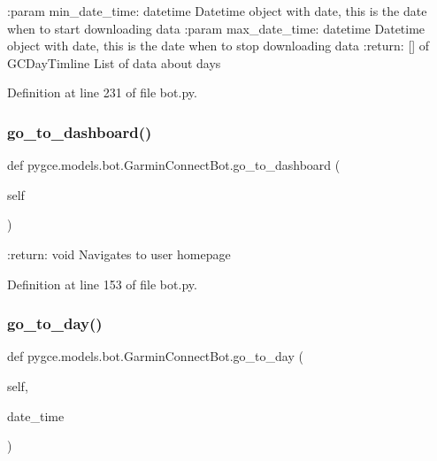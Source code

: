 \begin{DoxyVerb}:param min_date_time: datetime
    Datetime object with date, this is the date when to start downloading data
:param max_date_time: datetime
    Datetime object with date, this is the date when to stop downloading data
:return: [] of GCDayTimline
    List of data about days
\end{DoxyVerb}
 

Definition at line 231 of file bot.\+py.

\mbox{\label{classpygce_1_1models_1_1bot_1_1_garmin_connect_bot_ad9433580f9aced25b650ddd5e912cc52}} 
\subsubsection{\texorpdfstring{go\+\_\+to\+\_\+dashboard()}{go\_to\_dashboard()}}
{\footnotesize\ttfamily def pygce.\+models.\+bot.\+Garmin\+Connect\+Bot.\+go\+\_\+to\+\_\+dashboard (\begin{DoxyParamCaption}\item[{}]{self }\end{DoxyParamCaption})}

\begin{DoxyVerb}:return: void
    Navigates to user homepage
\end{DoxyVerb}
 

Definition at line 153 of file bot.\+py.

\mbox{\label{classpygce_1_1models_1_1bot_1_1_garmin_connect_bot_a3a0df451b2e7c0667064adc5c0ba1ad5}} 
\subsubsection{\texorpdfstring{go\+\_\+to\+\_\+day()}{go\_to\_day()}}
{\footnotesize\ttfamily def pygce.\+models.\+bot.\+Garmin\+Connect\+Bot.\+go\+\_\+to\+\_\+day (\begin{DoxyParamCaption}\item[{}]{self,  }\item[{}]{date\+\_\+time }\end{DoxyParamCaption})}

